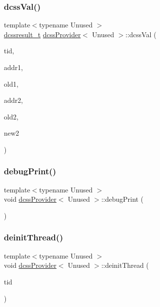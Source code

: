 \subsubsection{\texorpdfstring{dcss\+Val()}{dcssVal()}}
{\footnotesize\ttfamily template$<$typename Unused $>$ \\
\hyperlink{structdcssresult__t}{dcssresult\+\_\+t} \hyperlink{classdcssProvider}{dcss\+Provider}$<$ Unused $>$\+::dcss\+Val (\begin{DoxyParamCaption}\item[{const int}]{tid,  }\item[{\hyperlink{rq__unsafe_8h_ad45142aaf2ff20a036dc6242b8483e9c}{casword\+\_\+t} $\ast$}]{addr1,  }\item[{\hyperlink{rq__unsafe_8h_ad45142aaf2ff20a036dc6242b8483e9c}{casword\+\_\+t}}]{old1,  }\item[{\hyperlink{rq__unsafe_8h_ad45142aaf2ff20a036dc6242b8483e9c}{casword\+\_\+t} $\ast$}]{addr2,  }\item[{\hyperlink{rq__unsafe_8h_ad45142aaf2ff20a036dc6242b8483e9c}{casword\+\_\+t}}]{old2,  }\item[{\hyperlink{rq__unsafe_8h_ad45142aaf2ff20a036dc6242b8483e9c}{casword\+\_\+t}}]{new2 }\end{DoxyParamCaption})\hspace{0.3cm}{\ttfamily [inline]}}

\mbox{\label{classdcssProvider_ab102798781c2b99f0d8ba450f185520c}} 
\subsubsection{\texorpdfstring{debug\+Print()}{debugPrint()}}
{\footnotesize\ttfamily template$<$typename Unused $>$ \\
void \hyperlink{classdcssProvider}{dcss\+Provider}$<$ Unused $>$\+::debug\+Print (\begin{DoxyParamCaption}{ }\end{DoxyParamCaption})}

\mbox{\label{classdcssProvider_afe7a4173646ddfd368a8eb937dfee33b}} 
\subsubsection{\texorpdfstring{deinit\+Thread()}{deinitThread()}}
{\footnotesize\ttfamily template$<$typename Unused $>$ \\
void \hyperlink{classdcssProvider}{dcss\+Provider}$<$ Unused $>$\+::deinit\+Thread (\begin{DoxyParamCaption}\item[{const int}]{tid }\end{DoxyParamCaption})}


